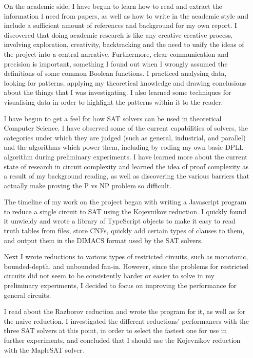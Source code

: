 \documentclass{article}
\begin{document}
On the academic side, I have begun to learn how to read and extract the information I need from papers, as well as how to write in the academic style and include a sufficient amount of references and background for my own report. I discovered that doing academic research is like any creative creative process, involving exploration, creativity, backtracking and the need to unify the ideas of the project into a central narrative. Furthermore, clear communication and precision is important, something I found out when I wrongly assumed the definitions of some common Boolean functions. I practiced analysing data, looking for patterns, applying my theoretical knowledge and drawing conclusions about the things that I was investigating. I also learned some techniques for visualising data in order to highlight the patterns within it to the reader.

I have begun to get a feel for how SAT solvers can be used in theoretical Computer Science. I have observed some of the current capabilities of solvers, the categories under which they are judged (such as general, industrial, and parallel) and the algorithms which power them, including by coding my own basic DPLL algorithm during preliminary experiments. I have learned more about the current state of research in circuit complexity and learned the idea of proof complexity as a result of my background reading, as well as discovering the various barriers that actually make proving the P vs NP problem so difficult.

The timeline of my work on the project began with writing a Javascript program to reduce a single circuit to SAT using the Kojevnikov reduction. I quickly found it unwieldy and wrote a library of TypeScript objects to make it easy to read truth tables from files, store CNFs, quickly add certain types of clauses to them, and output them in the DIMACS format used by the SAT solvers. 

Next I wrote reductions to various types of restricted circuits, such as monotonic, bounded-depth, and unbounded fan-in. However, since the problems for restricted circuits did not seem to be consistently harder or easier to solve in my preliminary experiments, I decided to focus on improving the performance for general circuits.

I read about the Razborov reduction and wrote the program for it, as well as for the naive reduction. I investigated the different reductions' performances with the three SAT solvers at this point, in order to select the fastest one for use in further experiments, and concluded that I should use the Kojevnikov reduction with the MapleSAT solver.
\end{document}

